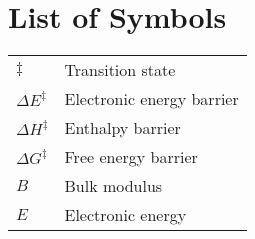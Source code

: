 \chapter{List of Symbols}

\vspace{-0.5cm}

\begin{longtable}{p{} p{}}
\hline
${\ddagger}$ & Transition state\\
$ \Delta E^{\ddagger}$ &  Electronic energy barrier\\
$ \Delta H^{\ddagger}$ &  Enthalpy barrier\\
$ \Delta G^{\ddagger}$ &  Free energy barrier\\ 
$ B $ & Bulk modulus\\
$ E $ & Electronic energy\\

\end{longtable}
